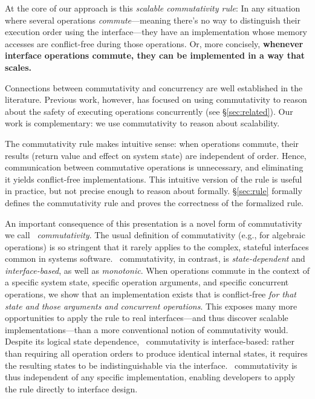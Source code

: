At the core of our approach is this \emph{scalable commutativity rule}: In any
situation where several operations \emph{commute}---meaning
there's no way to distinguish their execution order using the
interface---they have an implementation whose memory accesses
are conflict-free during those operations.
Or, more concisely,
\textbf{whenever interface operations commute, they can be implemented in a way
  that scales.}

Connections between commutativity and concurrency are well
established in the literature.  Previous work, however, has focused on
using commutativity to reason about the safety of executing operations
concurrently (see \S\ref{sec:related}).  Our work is complementary: we
use commutativity to reason about scalability.


The commutativity rule makes
intuitive sense: when operations commute, their
results (return value and effect on system state) are independent of order.
Hence, communication between commutative operations is
unnecessary, and eliminating it yields conflict-free implementations.
%
This intuitive version of the rule is useful in practice, but
not precise enough to reason
about formally.
%
\S\ref{sec:rule} formally defines the commutativity rule and proves
the correctness of the formalized rule.

An important consequence of this presentation is a novel form of
commutativity we call \emph{\SIM\ commutativity}.
%
The usual definition of commutativity (e.g., for algebraic operations)
is so stringent that it rarely applies to the complex, stateful
interfaces common in systems software.
%
\SIM\ commutativity, in contrast, is \emph{state-dependent} and
\emph{interface-based}, as well as \emph{monotonic}.
%
When operations commute in the context of a specific system state,
specific operation arguments, and specific concurrent operations, we
show that an implementation exists that is conflict-free \emph{for that state
  and those arguments and concurrent operations}.
%
This exposes many more opportunities to apply the rule to real
interfaces---and thus discover scalable implementations---than a more
conventional notion of commutativity would.
%
Despite its logical state dependence, \SIM\ commutativity is
interface-based: rather than requiring all operation orders to produce
identical internal states, it requires the resulting states to be
indistinguishable via the interface.
%
\SIM\ commutativity is thus independent of any specific
implementation, enabling developers to apply the rule directly to
interface design.

